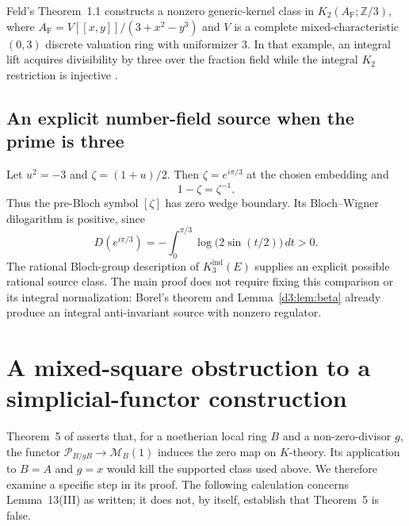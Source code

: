 \documentclass[11pt,a4paper]{amsart}
\numberwithin{equation}{section}
\theoremstyle{definition}
\theoremstyle{remark}
\begin{document}
Feld's Theorem~1.1 \cite{FeldFiniteGersten2026} constructs a nonzero
generic-kernel class in $K_2(A_{\mathrm F};\mathbb{Z}/3)$, where
$A_{\mathrm F}=V[[x,y]]/(3+x^2-y^3)$ and $V$ is a complete mixed-characteristic
$(0,3)$ discrete valuation ring with uniformizer $3$.
In that example, an integral lift acquires divisibility by three over
the fraction field while the integral $K_2$ restriction is injective
\cite[Corollary~5.1]{FeldFiniteGersten2026}.

\subsection{An explicit number-field source when the prime is three}
Let $u^2=-3$ and $\zeta=(1+u)/2$. Then $\zeta=e^{i\pi/3}$ at the chosen embedding and
\[
1-\zeta=\zeta^{-1}.
\]
Thus the pre-Bloch symbol $[\zeta]$ has zero wedge boundary. Its Bloch--Wigner dilogarithm is positive, since
\[
D(e^{i\pi/3})=-\int_0^{\pi/3}\log\bigl(2\sin(t/2)\bigr)\,dt>0.
\]
The rational Bloch-group description of $K_3^{\mathrm{ind}}(E)$ \cite[VI, Theorem~5.2]{Weibel} supplies an explicit possible rational source class. The main proof does not require fixing this comparison or its integral normalization: Borel's theorem and Lemma~\ref{d3:lem:beta} already produce an integral anti-invariant source with nonzero regulator.

\section{A mixed-square obstruction to a simplicial-functor construction}
\label{d3:sec:mochizukisquare}

Theorem~5 of \cite{MochizukiParameters} asserts that, for a noetherian
local ring $B$ and a non-zero-divisor $g$, the functor
$\mathcal P_{B/gB}\to\mathcal M_B(1)$ induces the zero map on
$K$-theory. Its application to $B=A$ and $g=x$ would kill the supported
class used above. We therefore examine a specific step in its proof.
The following calculation concerns Lemma~13(III) as written; it does
not, by itself, establish that Theorem~5 is false.
\end{document}
